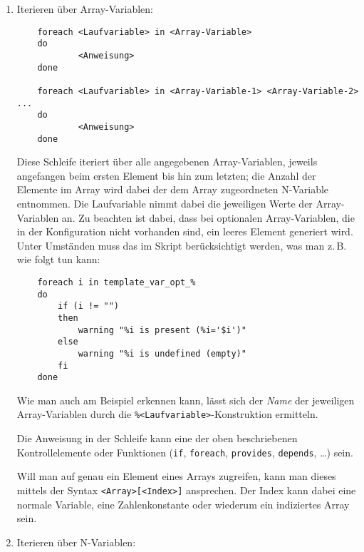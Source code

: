     \begin{enumerate}
    \item Iterieren über Array-Variablen:

\begin{example}
\begin{verbatim}
    foreach <Laufvariable> in <Array-Variable>
    do
            <Anweisung>
    done

    foreach <Laufvariable> in <Array-Variable-1> <Array-Variable-2> ...
    do
            <Anweisung>
    done
\end{verbatim}
\end{example}

    Diese Schleife iteriert über alle angegebenen Array-Variablen, jeweils
    angefangen beim ersten Element bis hin zum letzten; die Anzahl der Elemente
    im Array wird dabei der dem Array zugeordneten N-Variable
    entnommen. Die Lauf\-vari\-able nimmt dabei die jeweiligen Werte der
    Array-Variablen an. Zu beachten ist dabei, dass bei optionalen
    Array-Variablen, die in der Konfiguration nicht vorhanden sind,
    ein leeres Element generiert wird. Unter Umständen muss das im Skript
    berücksichtigt werden, was man z.\,B. wie folgt tun kann:

\begin{example}
\begin{verbatim}
    foreach i in template_var_opt_%
    do
        if (i != "")
        then
            warning "%i is present (%i='$i')"
        else
            warning "%i is undefined (empty)"
        fi
    done
\end{verbatim}
\end{example}

    Wie man auch am Beispiel erkennen kann, lässt sich der \emph{Name} der
    jeweiligen Array-Variablen durch die \texttt{\%<Laufvariable>}-Konstruktion
    ermitteln.

    Die Anweisung in der Schleife kann eine der oben beschriebenen
    Kontrollelemente oder Funktionen (\texttt{if}, \texttt{foreach},
    \texttt{provides}, \texttt{depends}, \ldots) sein.

    Will man auf genau ein Element eines Arrays zugreifen, kann man dieses
    mittels der Syntax \texttt{<Array>[<Index>]} ansprechen. Der Index kann
    dabei eine normale Variable, eine Zahlenkonstante oder wiederum ein
    indiziertes Array sein.

    \item Iterieren über N-Variablen:


\end{enumerate}
